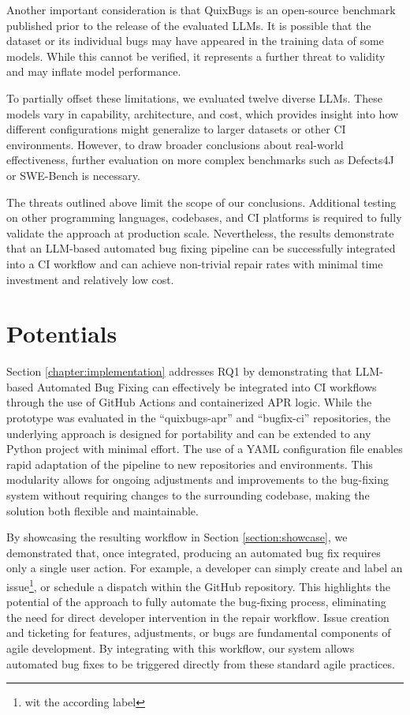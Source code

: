 Another important consideration is that QuixBugs is an open-source benchmark published prior to the release of the evaluated \acp{LLM}. It is possible that the dataset or its individual bugs may have appeared in the training data of some models. While this cannot be verified, it represents a further threat to validity and may inflate model performance.

To partially offset these limitations, we evaluated twelve diverse \acp{LLM}. These models vary in capability, architecture, and cost, which provides insight into how different configurations might generalize to larger datasets or other CI environments. However, to draw broader conclusions about real-world effectiveness, further evaluation on more complex benchmarks such as Defects4J or SWE-Bench is necessary.

The threats outlined above limit the scope of our conclusions. Additional testing on other programming languages, codebases, and CI platforms is required to fully validate the approach at production scale. Nevertheless, the results demonstrate that an LLM-based automated bug fixing pipeline can be successfully integrated into a CI workflow and can achieve non-trivial repair rates with minimal time investment and relatively low cost.

\section{Potentials}

Section \ref{chapter:implementation} addresses RQ1 by demonstrating that LLM-based Automated Bug Fixing can effectively be integrated into \ac{CI} workflows through the use of GitHub Actions and containerized APR logic. While the prototype was evaluated in the ``quixbugs-apr'' and ``bugfix-ci'' repositories, the underlying approach is designed for portability and can be extended to any Python project with minimal effort. The use of a YAML configuration file enables rapid adaptation of the pipeline to new repositories and environments. This modularity allows for ongoing adjustments and improvements to the bug-fixing system without requiring changes to the surrounding codebase, making the solution both flexible and maintainable.

By showcasing the resulting workflow in Section \ref{section:showcase}, we demonstrated that, once integrated, producing an automated bug fix requires only a single user action. For example, a developer can simply create and label an issue\footnote{wit the according label}, or schedule a dispatch within the GitHub repository. This highlights the potential of the approach to fully automate the bug-fixing process, eliminating the need for direct developer intervention in the repair workflow. Issue creation and ticketing for features, adjustments, or bugs are fundamental components of agile development. By integrating with this workflow, our system allows automated bug fixes to be triggered directly from these standard agile practices.

